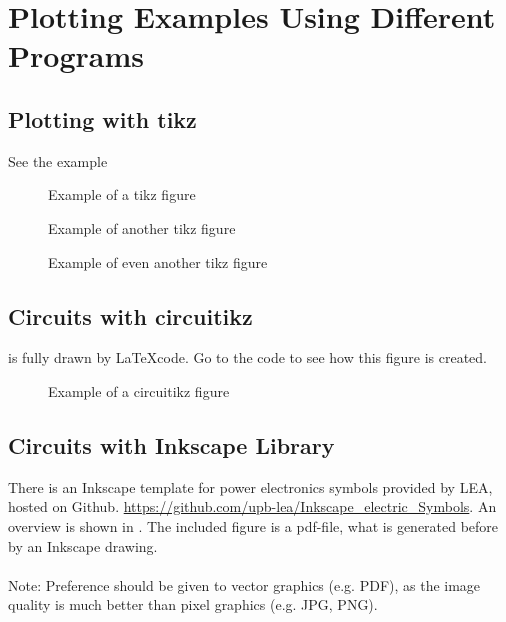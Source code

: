 \chapter{Plotting Examples Using Different Programs} 
\label{cha:evaluation}

\section{Plotting with tikz}

See the example 
\begin{figure}[ht]
    \centering
    
    \caption{Example of a tikz figure}
    \label{fig:tikz_example_01}
\end{figure}
\begin{figure}[ht]
    \centering
    
    \caption{Example of another tikz figure}
    \label{fig:tikz_example_02}
\end{figure}
\begin{figure}[ht]
    \centering
    
    \caption{Example of even another tikz figure}
    \label{fig:tikz_example_03}
\end{figure}



\section{Circuits with circuitikz}
 is fully drawn by \LaTeX code. Go to the code to see how this figure is created.
\begin{figure}[ht]
    \centering
    
    \caption{Example of a circuitikz figure}
    \label{fig:circuitikz_example}
\end{figure}


\section{Circuits with Inkscape Library}
There is an Inkscape template for power electronics symbols provided by LEA, hosted on Github. \href{https://github.com/upb-lea/Inkscape_electric_Symbols}{https://github.com/upb-lea/Inkscape\_electric\_Symbols}. An overview is shown in . The included figure is a pdf-file, what is generated before by an Inkscape drawing.
\\ \\
Note: Preference should be given to vector graphics (e.g. PDF), as the image quality is much better than pixel graphics (e.g. JPG, PNG).


